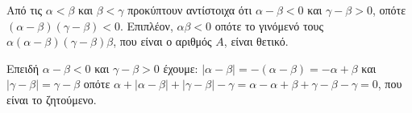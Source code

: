 
\begin{alist}
\item 
Από τις $\alpha < \beta$ και $\beta < \gamma$ προκύπτουν αντίστοιχα ότι $\alpha - \beta < 0$ και $\gamma - \beta > 0$, οπότε
$(\alpha - \beta)(\gamma - \beta) < 0$. Επιπλέον, $\alpha\beta < 0$ οπότε το γινόμενό τους $\alpha(\alpha - \beta)(\gamma - \beta)\beta$, που είναι ο
αριθμός $A$, είναι θετικό.
\item Επειδή $\alpha - \beta < 0$ και $\gamma - \beta > 0$ έχουμε:
$|\alpha - \beta| = -(\alpha - \beta) = -\alpha + \beta$ και $|\gamma - \beta| = \gamma - \beta$
οπότε $\alpha + |\alpha - \beta| + |\gamma - \beta| - \gamma = \alpha - \alpha + \beta + \gamma - \beta - \gamma = 0$, που είναι το ζητούμενο.
\end{alist}

